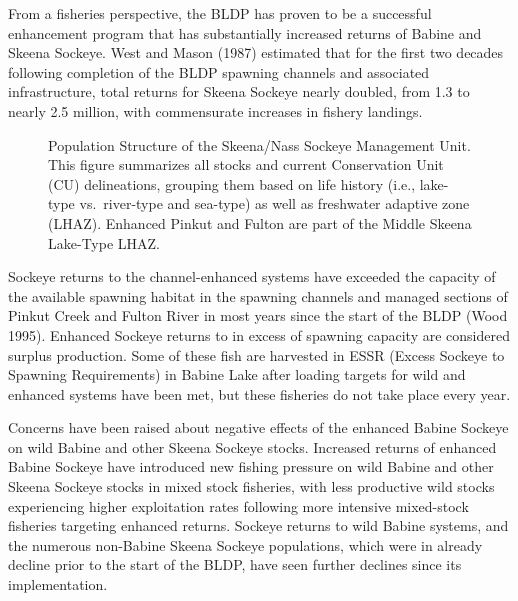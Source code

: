 \documentclass[french,11pt]{book}
\begin{document}
From a fisheries perspective, the BLDP has proven to be a successful enhancement program that has substantially increased returns of Babine and Skeena Sockeye. West and Mason (1987) estimated that for the first two decades following completion of the BLDP spawning channels and associated infrastructure, total returns for Skeena Sockeye nearly doubled, from 1.3 to nearly 2.5 million, with commensurate increases in fishery landings.


\begin{figure}[H]

{\centering {} 

}

\caption{Population Structure of the Skeena/Nass Sockeye Management Unit. This figure summarizes all stocks and current Conservation Unit (CU) delineations, grouping them based on life history (i.e., lake-type vs.~river-type and sea-type) as well as freshwater adaptive zone (LHAZ). Enhanced Pinkut and Fulton are part of the Middle Skeena Lake-Type LHAZ.}\label{fig:PopStrucGeneral}
\end{figure}
Sockeye returns to the channel-enhanced systems have exceeded the capacity of the available spawning habitat in the spawning channels and managed sections of Pinkut Creek and Fulton River in most years since the start of the BLDP (Wood 1995). Enhanced Sockeye returns to in excess of spawning capacity are considered surplus production. Some of these fish are harvested in ESSR (Excess Sockeye to Spawning Requirements) in Babine Lake after loading targets for wild and enhanced systems have been met, but these fisheries do not take place every year.

Concerns have been raised about negative effects of the enhanced Babine Sockeye on wild Babine and other Skeena Sockeye stocks. Increased returns of enhanced Babine Sockeye have introduced new fishing pressure on wild Babine and other Skeena Sockeye stocks in mixed stock fisheries, with less productive wild stocks experiencing higher exploitation rates following more intensive mixed-stock fisheries targeting enhanced returns. Sockeye returns to wild Babine systems, and the numerous non-Babine Skeena Sockeye populations, which were in already decline prior to the start of the BLDP, have seen further declines since its implementation.
\end{document}
